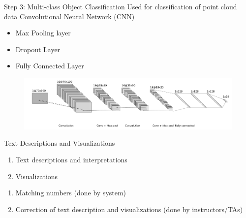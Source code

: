 \documentclass[9pt]{beamer}
\begin{document}

\begin{frame}[fragile]{Step 3: Multi-class Object Classification}	
	Used for classification of point cloud data Convolutional Neural Network (CNN) 
	
	\begin{itemize}
		\item Max Pooling layer
		\item Dropout Layer
		\item Fully Connected Layer  
	\end{itemize}
	
	\begin{figure}
		\centering
		\includegraphics[width=\textwidth]{images/object_net.pdf}
		
	\end{figure}
\end{frame}


\begin{frame}[fragile]{Text Descriptions and Visualizations}


\begin{enumerate}
  \item Text descriptions and interpretations  
  \item Visualizations    
\end{enumerate}



\begin{enumerate}
  \item Matching numbers (done by system)
  \item Correction of text description and visualizations (done by instructors/TAs) 
\end{enumerate}
 


\end{frame}
\end{document}
